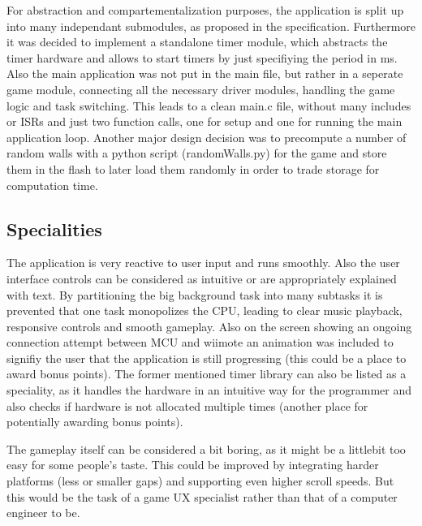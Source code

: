 \documentclass[12pt,a4paper,titlepage,oneside]{article}
\begin{document}
For abstraction and compartementalization purposes, the application is split
up into many independant submodules, as proposed in the specification. Furthermore 
it was decided to implement a standalone timer module, which abstracts the timer
hardware and allows to start timers by just specifiying the period in ms.
Also the main application was not put in the main file, but rather in a 
seperate game module, connecting all the necessary driver modules, handling
the game logic and task switching. This leads to a clean main.c file, without
many includes or ISRs and just two function calls, one for setup and one for
running the main application loop. Another major design decision was to 
precompute a number of random walls with a python script (randomWalls.py) for the game and store
them in the flash to later load them randomly in order to trade storage for 
computation time.

\subsection{Specialities}

The application is very reactive to user input and runs smoothly. Also the
user interface controls can be considered as intuitive or are appropriately
explained with text. By partitioning the big background task into many subtasks
it is prevented that one task monopolizes the CPU, leading to clear music 
playback, responsive controls and smooth gameplay. Also on the screen showing
an ongoing connection attempt between MCU and wiimote an animation was included
to signifiy the user that the application is still progressing (this could be a place to award bonus points). The former
mentioned timer library can also be listed as a speciality, as it handles the
hardware in an intuitive way for the programmer and also checks if hardware
is not allocated multiple times (another place for potentially awarding bonus points).

The gameplay itself can be considered a bit boring, as it might be a littlebit too
easy for some people's taste. This could be improved by integrating harder
platforms (less or smaller gaps) and supporting even higher scroll speeds.
But this would be the task of a game UX specialist rather than that of a 
computer engineer to be.

\end{document}
